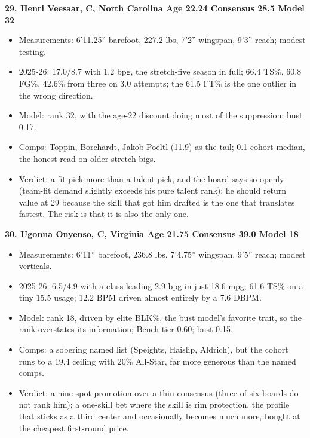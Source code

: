 \documentclass[
  10pt,
]{article}
\providecommand{\tightlist}{%
  \setlength{\itemsep}{0pt}\setlength{\parskip}{0pt}}
\begin{document}
\textbf{29. Henri Veesaar, C, North Carolina \textbar{} Age 22.24 \textbar{}
Consensus 28.5 \textbar{} Model 32}

\begin{itemize}
\tightlist
\item
  Measurements: 6'11.25'' barefoot, 227.2 lbs, 7'2'' wingspan, 9'3'' reach;
  modest testing.
\item
  2025-26: 17.0/8.7 with 1.2 bpg, the stretch-five season in full; 66.4 TS\%,
  60.8 FG\%, 42.6\% from three on 3.0 attempts; the 61.5 FT\% is the one outlier
  in the wrong direction.
\item
  Model: rank 32, with the age-22 discount doing most of the suppression; bust
  0.17.
\item
  Comps: Toppin, Borchardt, Jakob Poeltl (11.9) as the tail; 0.1 cohort median,
  the honest read on older stretch bigs.
\item
  Verdict: a fit pick more than a talent pick, and the board says so openly
  (team-fit demand slightly exceeds his pure talent rank); he should return
  value at 29 because the skill that got him drafted is the one that translates
  fastest. The risk is that it is also the only one.
\end{itemize}

\textbf{30. Ugonna Onyenso, C, Virginia \textbar{} Age 21.75 \textbar{}
Consensus 39.0 \textbar{} Model 18}

\begin{itemize}
\tightlist
\item
  Measurements: 6'11'' barefoot, 236.8 lbs, 7'4.75'' wingspan, 9'5'' reach;
  modest verticals.
\item
  2025-26: 6.5/4.9 with a class-leading 2.9 bpg in just 18.6 mpg; 61.6 TS\% on a
  tiny 15.5 usage; 12.2 BPM driven almost entirely by a 7.6 DBPM.
\item
  Model: rank 18, driven by elite BLK\%, the bust model's favorite trait, so the
  rank overstates its information; Bench tier 0.60; bust 0.15.
\item
  Comps: a sobering named list (Speights, Haislip, Aldrich), but the cohort runs
  to a 19.4 ceiling with 20\% All-Star, far more generous than the named comps.
\item
  Verdict: a nine-spot promotion over a thin consensus (three of six boards do
  not rank him); a one-skill bet where the skill is rim protection, the profile
  that sticks as a third center and occasionally becomes much more, bought at
  the cheapest first-round price.
\end{itemize}
\end{document}
